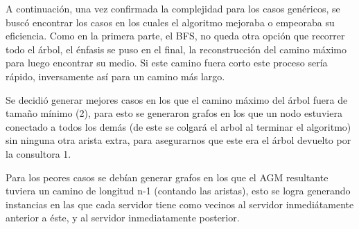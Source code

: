 \documentclass[A4paper,oneside,fleqn,11pt]{article}
\theoremstyle{definition}
\begin{document}
A continuación, una vez confirmada la complejidad para los casos genéricos, se buscó encontrar los casos en los cuales el algoritmo mejoraba o empeoraba su eficiencia. Como en la primera parte, el BFS, no queda otra opción que recorrer todo el árbol, el énfasis se puso en el final, la reconstrucción del camino máximo para luego encontrar su medio. Si este camino fuera corto este proceso sería rápido, inversamente así para un camino más largo.

Se decidió generar mejores casos en los que el camino máximo del árbol fuera de tamaño mínimo (2), para esto se generaron grafos en los que un nodo estuviera conectado a todos los demás (de este se colgará el arbol al terminar el algoritmo) sin ninguna otra arista extra, para asegurarnos que este era el árbol devuelto por la consultora 1.

Para los peores casos se debían generar grafos en los que el AGM resultante tuviera un camino de longitud n-1 (contando las aristas), esto se logra generando instancias en las que cada servidor tiene como vecinos al servidor inmediátamente anterior a éste, y al servidor inmediatamente posterior.
\end{document}

